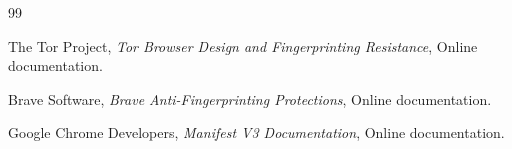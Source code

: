 \documentclass[11pt]{report}
\begin{document}
\begin{thebibliography}{99}

The Tor Project,
\textit{Tor Browser Design and Fingerprinting Resistance},
Online documentation.

Brave Software,
\textit{Brave Anti-Fingerprinting Protections},
Online documentation.

Google Chrome Developers,
\textit{Manifest V3 Documentation},
Online documentation.

\end{thebibliography}

\end{document}
